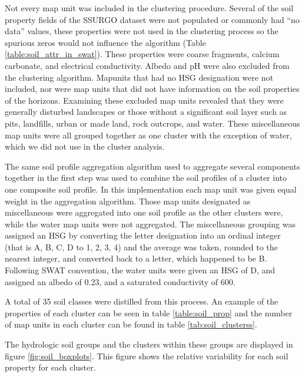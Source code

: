 Not every map unit was included in the clustering procedure. Several of the soil property fields of the SSURGO dataset were not populated or commonly had ``no data'' values, these properties were not used in the
clustering process so the spurious zeros would not influence the algorithm (Table \ref{table:soil_attr_in_swat}). These properties were coarse fragments, calcium carbonate, and electrical conductivity. Albedo and pH were also excluded from the clustering algorithm. Mapunits that had no HSG designation were not included, nor were map units that did not have information on the soil properties of the horizons. Examining these excluded map units revealed that they were generally disturbed landscapes or those without a significant soil layer such as pits, landfills, urban or made land, rock outcrops, and water. These miscellaneous map units were all grouped together as one cluster with the exception of water, which we did not use in the cluster analysis.

The same soil profile aggregation algorithm \citep{beaudette_algorithms_2013}
used to aggregate several components together in the first step was used to combine the soil profiles of a cluster into one
composite soil profile. In this implementation each map unit was given equal
weight in the aggregation algorithm. Those map units designated as miscellaneous
were aggregated into one soil profile as the other clusters were, while the
water map units were not aggregated. The miscellaneous grouping was assigned an
HSG by converting the letter designation into an ordinal
integer (that is A, B, C, D to 1, 2, 3, 4) and the average was taken, rounded to
the nearest integer, and converted back to a letter, which happened to be B. Following SWAT convention, the water units
were given an HSG of D, and assigned an albedo of 0.23, and a saturated conductivity
of 600.

A total of 35 soil classes were distilled from this process. An example of the properties of each cluster can be seen in table \ref{table:soil_prop} and the number of map units in each cluster can be found in table \ref{tab:soil_clusterss}. 

The hydrologic soil groups and the clusters within these groups are displayed in figure \ref{fig:soil_boxplots}. This figure shows the relative variability for each soil property for each cluster.

